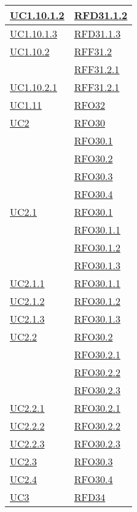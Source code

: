 \begin{longtable}{|>{\centering}m{5cm}|m{5cm}<{\centering}|}
\hyperref[UC1.10.1.2]{UC1.10.1.2} & \hyperlink{RFD31.1.2}{RFD31.1.2}\\ \hline
\hyperref[UC1.10.1.3]{UC1.10.1.3} & \hyperlink{RFD31.1.3}{RFD31.1.3}\\ \hline
\hyperref[UC1.10.2]{UC1.10.2} & \hyperlink{RFF31.2}{RFF31.2}\\
& \hyperlink{RFF31.2.1}{RFF31.2.1}\\ \hline
\hyperref[UC1.10.2.1]{UC1.10.2.1} & \hyperlink{RFF31.2.1}{RFF31.2.1}\\ \hline
\hyperref[UC1.11]{UC1.11} & \hyperlink{RFO32}{RFO32}\\ \hline
\hyperref[UC2]{UC2} & \hyperlink{RFO30}{RFO30}\\
& \hyperlink{RFO30.1}{RFO30.1}\\
& \hyperlink{RFO30.2}{RFO30.2}\\
& \hyperlink{RFO30.3}{RFO30.3}\\
& \hyperlink{RFO30.4}{RFO30.4}\\ \hline
\hyperref[UC2.1]{UC2.1} & \hyperlink{RFO30.1}{RFO30.1}\\
& \hyperlink{RFO30.1.1}{RFO30.1.1}\\
& \hyperlink{RFO30.1.2}{RFO30.1.2}\\
& \hyperlink{RFO30.1.3}{RFO30.1.3}\\ \hline
\hyperref[UC2.1.1]{UC2.1.1} & \hyperlink{RFO30.1.1}{RFO30.1.1}\\ \hline
\hyperref[UC2.1.2]{UC2.1.2} & \hyperlink{RFO30.1.2}{RFO30.1.2}\\ \hline
\hyperref[UC2.1.3]{UC2.1.3} & \hyperlink{RFO30.1.3}{RFO30.1.3}\\ \hline
\hyperref[UC2.2]{UC2.2} & \hyperlink{RFO30.2}{RFO30.2}\\
& \hyperlink{RFO30.2.1}{RFO30.2.1}\\
& \hyperlink{RFO30.2.2}{RFO30.2.2}\\
& \hyperlink{RFO30.2.3}{RFO30.2.3}\\ \hline
\hyperref[UC2.2.1]{UC2.2.1} & \hyperlink{RFO30.2.1}{RFO30.2.1}\\ \hline
\hyperref[UC2.2.2]{UC2.2.2} & \hyperlink{RFO30.2.2}{RFO30.2.2}\\ \hline
\hyperref[UC2.2.3]{UC2.2.3} & \hyperlink{RFO30.2.3}{RFO30.2.3}\\ \hline
\hyperref[UC2.3]{UC2.3} & \hyperlink{RFO30.3}{RFO30.3}\\ \hline
\hyperref[UC2.4]{UC2.4} & \hyperlink{RFO30.4}{RFO30.4}\\ \hline
\hyperref[UC3]{UC3} & \hyperlink{RFD34}{RFD34}\\

\end{longtable}
